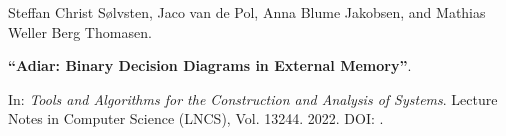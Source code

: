 Steffan Christ Sølvsten, Jaco van de Pol, Anna Blume Jakobsen, and Mathias Weller Berg Thomasen.

{\bf ``Adiar: Binary Decision Diagrams in External Memory''}.

In: \emph{Tools and Algorithms for the Construction and Analysis of Systems}.
Lecture Notes in Computer Science (LNCS), Vol. 13244. 2022.
DOI: .

\label{cite:2022.tacas}

